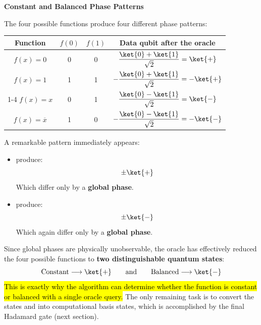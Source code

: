 \newpage

\begin{flushleft}
    \textcolor{Green3}{ \textbf{Constant and Balanced Phase Patterns}}
\end{flushleft}
The four possible functions produce four different phase patterns:
\begin{center}
    \begin{tabular}{@{} c c c c @{}}
        \toprule
        \textbf{Function} & $f(0)$ & $f(1)$ & \textbf{Data qubit after the oracle} \\
        \midrule
        $f(x)=0$            & 0 & 0 & $\dfrac{\ket{0} + \ket{1}}{\sqrt{2}}=\ket{+}$ \\[1.2em]
        $f(x)=1$            & 1 & 1 & $-\dfrac{\ket{0} + \ket{1}}{\sqrt{2}}=-\ket{+}$ \\
        \cmidrule{1-4}
        $f(x)=x$            & 0 & 1 & $\dfrac{\ket{0} - \ket{1}}{\sqrt{2}}=\ket{-}$ \\[1.2em]
        $f(x)=\overline{x}$ & 1 & 0 & $-\dfrac{\ket{0} - \ket{1}}{\sqrt{2}}=-\ket{-}$ \\
        \bottomrule
    \end{tabular}
\end{center}

\noindent
A remarkable pattern immediately appears:
\begin{itemize}
    \item {} produce:
    \begin{equation*}
        \pm \ket{+}
    \end{equation*}
    Which differ only by a \textbf{global phase}.
    \item {} produce:
    \begin{equation*}
        \pm \ket{-}
    \end{equation*}
    Which again differ only by a \textbf{global phase}.
\end{itemize}
Since global phases are physically unobservable, the oracle has effectively reduced the four possible functions to \textbf{two distinguishable quantum states}:
\begin{equation*}
    \text{Constant} \longrightarrow \ket{+} \qquad \text{and} \qquad \text{Balanced} \longrightarrow \ket{-}
\end{equation*}
\hl{This is exactly why the algorithm can determine whether the function is constant or balanced with a single oracle query.} The only remaining task is to convert the states \ket{+} and \ket{-} into computational basis states, which is accomplished by the final Hadamard gate (next section).